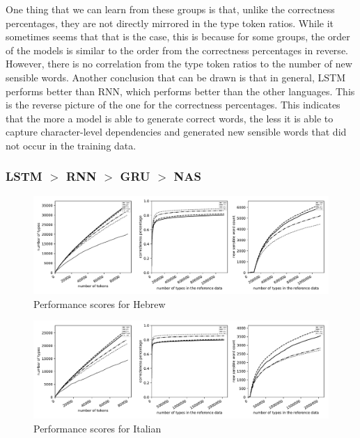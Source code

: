 \documentclass[11pt,a4paper,twoside,openright]{scrbook}
\begin{document}
One thing that we can learn from these groups is that, unlike the correctness percentages, they are not directly mirrored in the type token ratios. While it sometimes seems that that is the case, this is because for some groups, the order of the models is similar to the order from the correctness percentages in reverse. However, there is no correlation from the type token ratios to the number of new sensible words. Another conclusion that can be drawn is that in general, LSTM performs better than RNN, which performs better than the other languages. This is the reverse picture of the one for the correctness percentages. This indicates that the more a model is able to generate correct words, the less it is able to capture character-level dependencies and generated new sensible words that did not occur in the training data. 

\subsubsection{LSTM $>$ RNN $>$ GRU $>$ NAS}

\begin{figure}
\centering
\includegraphics[width=\textwidth]{graphs/he_all_graphs}
\caption{Performance scores for Hebrew}
\label{Figure:he_all_graphs}
\end{figure}

\begin{figure}
\centering
\includegraphics[width=\textwidth]{graphs/it_all_graphs}
\caption{Performance scores for Italian}
\label{Figure:it_all_graphs}
\end{figure}
\end{document}
